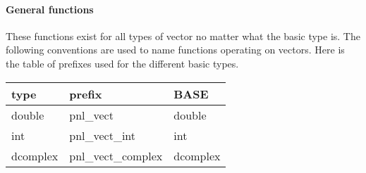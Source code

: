 \paragraph{General functions}
These functions exist for all types of vector no matter what the basic type
is. The following conventions are used to name functions operating on vectors.
Here is the table of prefixes used for the different basic types.

\begin{center}
  \begin{tabular}[t]{lll}
    type & prefix & BASE\\
    \hline
    double & pnl_vect & double \\
    \hline
    int & pnl_vect_int & int \\
    \hline
    dcomplex & pnl_vect_complex & dcomplex
  \end{tabular}
\end{center}

